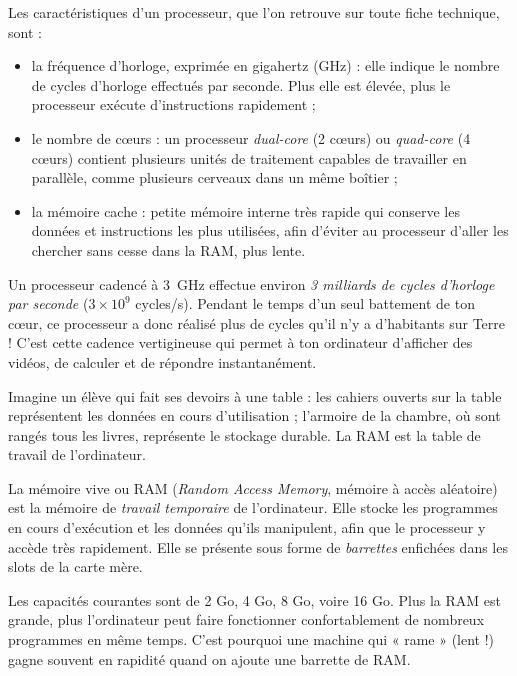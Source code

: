 \documentclass[11pt]{article}
\newcommand{\cle}[1]{{\popxbold\color{popdark}#1}}
\newcounter{popsec}
\newcounter{popsub}
\newcommand{\courssub}[1]{%
  \stepcounter{popsub}%
  \par\vspace{9pt}\noindent{\popxbold\fontsize{11.5}{13}\selectfont\color{popink}{\color{poporange}\thepopsec.\thepopsub}\hspace{6pt}#1}\par\nopagebreak\vspace{4pt}
}
\begin{document}
Les caractéristiques d'un processeur, que l'on retrouve sur toute fiche technique, sont :

\begin{itemize}
\item la \cle{fréquence d'horloge}, exprimée en gigahertz (GHz) : elle indique le nombre de cycles d'horloge effectués par seconde. Plus elle est élevée, plus le processeur exécute d'instructions rapidement ;
\item le \cle{nombre de cœurs} : un processeur \emph{dual-core} (2 cœurs) ou \emph{quad-core} (4 cœurs) contient plusieurs unités de traitement capables de travailler en parallèle, comme plusieurs cerveaux dans un même boîtier ;
\item la \cle{mémoire cache} : petite mémoire interne très rapide qui conserve les données et instructions les plus utilisées, afin d'éviter au processeur d'aller les chercher sans cesse dans la RAM, plus lente.
\end{itemize}

\begin{savaistu}
Un processeur cadencé à \SI{3}{GHz} effectue environ \emph{3 milliards de cycles d'horloge par seconde} ($3 \times 10^{9}$ cycles/s). Pendant le temps d'un seul battement de ton cœur, ce processeur a donc réalisé plus de cycles qu'il n'y a d'habitants sur Terre ! C'est cette cadence vertigineuse qui permet à ton ordinateur d'afficher des vidéos, de calculer et de répondre instantanément.
\end{savaistu}

\courssub{La mémoire vive (RAM) : la mémoire de travail}

Imagine un élève qui fait ses devoirs à une table : les cahiers ouverts sur la table représentent les données en cours d'utilisation ; l'armoire de la chambre, où sont rangés tous les livres, représente le stockage durable. La RAM est la table de travail de l'ordinateur.

\begin{definition}
La \cle{mémoire vive} ou \cle{RAM} (\emph{Random Access Memory}, mémoire à accès aléatoire) est la mémoire de \emph{travail temporaire} de l'ordinateur. Elle stocke les programmes en cours d'exécution et les données qu'ils manipulent, afin que le processeur y accède très rapidement. Elle se présente sous forme de \emph{barrettes} enfichées dans les slots de la carte mère.
\end{definition}

Les capacités courantes sont de \num{2} Go, \num{4} Go, \num{8} Go, voire \num{16} Go. Plus la RAM est grande, plus l'ordinateur peut faire fonctionner confortablement de nombreux programmes en même temps. C'est pourquoi une machine qui « rame » (lent !) gagne souvent en rapidité quand on ajoute une barrette de RAM.
\end{document}
